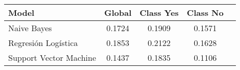 \begin{tabular}{p{3cm}|c|c|c|c}
\toprule
                  Model &  Global &  Class Yes &  Class No \\
\midrule
            Naive Bayes &  0.1724 &     0.1909 &    0.1571 \\
    Regresión Logística &  0.1853 &     0.2122 &    0.1628 \\
 Support Vector Machine &  0.1437 &     0.1835 &    0.1106 \\
\bottomrule
\end{tabular}
